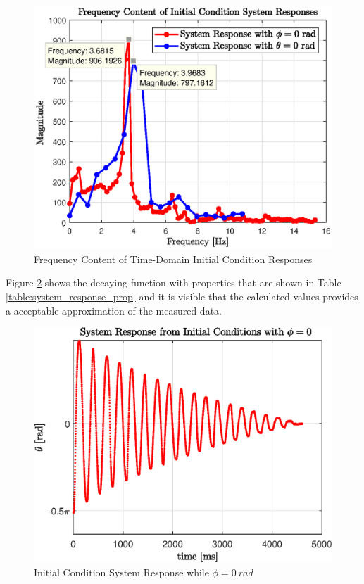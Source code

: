 \begin{figure}[h]
	\centering
	\includegraphics[scale=1]{./figs/FFT_system.eps}
	\caption{Frequency Content of Time-Domain Initial Condition Responses}
	\label{fig:fft_system_response}
\end{figure}

Figure \ref{fig:q1_response} shows the decaying function with properties that are shown in Table \ref{table:system_response_prop} and it is visible that the calculated values provides a acceptable approximation of the measured data.

\begin{figure}[h]
	\centering
	\includegraphics[scale=1]{./figs/q1_initial_response.eps}
	\caption{Initial Condition System Response while $ \phi = \SI{0}{rad} $ }
	\label{fig:q1_response}
\end{figure}


